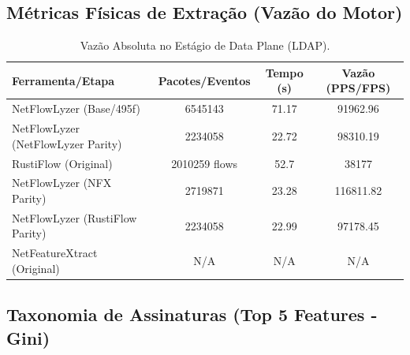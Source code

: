 \documentclass[11pt,a4paper]{article}
\begin{document}
\subsection{Métricas Físicas de Extração (Vazão do Motor)}
\begin{table}[H]
\centering
\begin{threeparttable}
\begin{tabular}{lccc}
\toprule
\textbf{Ferramenta/Etapa} & \textbf{Pacotes/Eventos} & \textbf{Tempo (s)} & \textbf{Vazão (PPS/FPS)} \\
\midrule
NetFlowLyzer (Base/495f) & 6545143 & 71.17 & 91962.96 \\
NetFlowLyzer (NetFlowLyzer Parity) & 2234058 & 22.72 & 98310.19 \\
RustiFlow (Original) & 2010259 flows & 52.7 & 38177 \\
NetFlowLyzer (NFX Parity) & 2719871 & 23.28 & 116811.82 \\
NetFlowLyzer (RustiFlow Parity) & 2234058 & 22.99 & 97178.45 \\
NetFeatureXtract (Original) & N/A & N/A & N/A \\
\bottomrule
\end{tabular}
\end{threeparttable}
\caption{Vazão Absoluta no Estágio de Data Plane (LDAP).}
\end{table}

\subsection{Taxonomia de Assinaturas (Top 5 Features - Gini)}
\begin{table}[H]
\centering
{}
\caption{Principais atributos de correlação estocástica por limiar dimensional (LDAP).}
\end{table}
\end{document}
